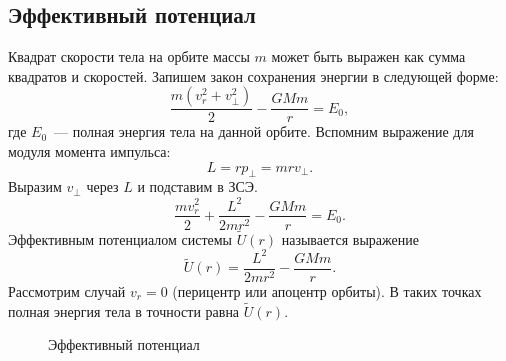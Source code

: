 \subsection{Эффективный потенциал}

Квадрат скорости тела на орбите массы $m$ может быть выражен как сумма квадратов  и  скоростей. Запишем закон сохранения энергии в следующей форме:
\begin{equation*}
	\frac{m(v^2_r + v^2_{\perp})}{2} - \frac{GMm}{r} = E_0,
\end{equation*}
где $E_0$~--- полная энергия тела на данной орбите. Вспомним выражение для модуля момента импульса:
\begin{equation}
	L = r p_{\perp} = mr v_{\perp}.
\end{equation}
Выразим $v_{\perp}$ через $L$ и подставим в ЗСЭ.
\begin{equation}
	\frac{m v^2_r}{2} + \frac{L^2}{2mr^2} - \frac{GMm}{r} = E_0.
\end{equation}
Эффективным потенциалом системы $\tilde{U}(r)$ называется выражение
\begin{equation}
	\tilde{U}(r) = \frac{L^2}{2mr^2} - \frac{GMm}{r}.
\end{equation}
Рассмотрим случай $v_r=0$ (перицентр или апоцентр орбиты). В таких точках полная энергия тела в точности равна $\tilde{U}(r)$.

\begin{wrapfigure}[8]{r}{0.3\tw}
    \centering
    \vspace{-0.8pc}
    \caption{Эффективный потенциал}
    \label{pic:effitient-potential-plot}
\end{wrapfigure} 

